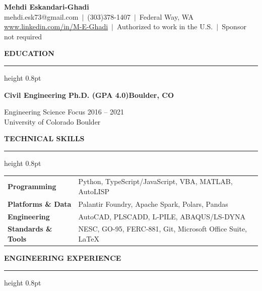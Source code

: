 \documentclass[10pt, letterpaper]{article}
\newcommand{\rsection}[1]{%
  \vspace{8pt}%
  {\large\bfseries\MakeUppercase{#1}}%
  \vspace{1pt}%
  \hrule height 0.8pt%
  \vspace{4pt}%
}
\newcommand{\jobline}[2]{%
  \vspace{5pt}%
  \noindent\textbf{#1}\hfill\textbf{#2}\par%
  \vspace{1pt}%
}
\begin{document}
\pagestyle{empty}

\begin{center}
  {\LARGE\bfseries Mehdi Eskandari-Ghadi}\\[4pt]
  mehdi.esk73@gmail.com\ $|$\ (303)378-1407\ $|$\ Federal Way, WA\\[2pt]
  \href{http://www.linkedin.com/in/M-E-Ghadi}{www.linkedin.com/in/M-E-Ghadi}\ $|$\
  Authorized to work in the U.S.\ $|$\ Sponsor not required
\end{center}

\vspace{2pt}

\rsection{Education}

\jobline{Civil Engineering Ph.D. (GPA 4.0)}{Boulder, CO}
Engineering Science Focus \hfill 2016 -- 2021\\
University of Colorado Boulder

\rsection{Technical Skills}

\vspace{2pt}
\begin{tabular}{@{}p{4cm}p{13cm}@{}}
  \textbf{Programming}       & Python, TypeScript/JavaScript, VBA, MATLAB, AutoLISP \\[2pt]
  \textbf{Platforms \& Data} & Palantir Foundry, Apache Spark, Polars, Pandas \\[2pt]
  \textbf{Engineering}       & AutoCAD, PLSCADD, L-PILE, ABAQUS/LS-DYNA \\[2pt]
  \textbf{Standards \& Tools} & NESC, GO-95, FERC-881, Git, Microsoft Office Suite, LaTeX \\
\end{tabular}

\rsection{Engineering Experience}
\end{document}
